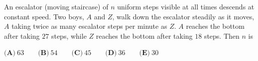 An escalator (moving staircase) of $n$ uniform steps visible at all times descends at constant speed. Two boys, $A$ and $Z$, walk down the escalator steadily as it moves, $A$ taking twice as many escalator steps per minute as $Z$. $A$ reaches the bottom after taking $27$ steps, while $Z$ reaches the bottom after taking $18$ steps. Then $n$ is

$\textbf{(A)}\ 63\qquad\textbf{(B)}\ 54\qquad\textbf{(C)}\ 45\qquad\textbf{(D)}\ 36\qquad\textbf{(E)}\ 30$
